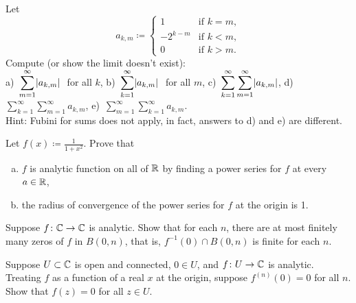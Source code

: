 \begin{exercise}
Let
\begin{equation*}
a_{k,m} \coloneqq
\begin{cases}
1        & \text{if } k=m,\\
-2^{k-m} & \text{if } k<m,\\
0        & \text{if } k>m.
\end{cases}
\end{equation*}
Compute (or show the limit doesn't exist):
\\
a)~$\displaystyle \sum_{m=1}^\infty \lvert {a_{k,m}} \rvert~$ for all $k$,
\hspace{\fill}
b)~$\displaystyle \sum_{k=1}^\infty \lvert {a_{k,m}} \rvert~$ for all $m$,
\hspace{\fill}
c)~$\displaystyle \sum_{k=1}^\infty \sum_{m=1}^\infty \lvert {a_{k,m}} \rvert$,
\hspace{\fill}
d)~$\displaystyle \sum_{k=1}^\infty \sum_{m=1}^\infty a_{k,m}$,
\hspace{\fill}
e)~$\displaystyle \sum_{m=1}^\infty \sum_{k=1}^\infty a_{k,m}$.
\\
Hint: Fubini for sums does not apply, in fact, answers to
d) and e) are different.
\end{exercise}

\begin{exercise}
\pagebreak[2]
Let $f(x) \coloneqq \frac{1}{1+x^2}$.  Prove that
\begin{enumerate}[a)]
\item
$f$ is analytic function on all of ${\mathbb{R}}$
by finding a power series for $f$ at every $a \in {\mathbb{R}}$,
\item
the radius of convergence of
the power series for $f$ at the origin is 1.
\end{enumerate}
\end{exercise}


\begin{exercise}
\pagebreak[2]
Suppose $f \colon {\mathbb{C}} \to {\mathbb{C}}$ is analytic.  Show that for each
$n$, there are at most finitely many zeros of $f$ in $B(0,n)$, that is,
$f^{-1}(0) \cap B(0,n)$ is finite for each $n$.
\end{exercise}

\begin{exercise}
Suppose $U \subset {\mathbb{C}}$ is open and connected, $0 \in U$, and $f \colon U
\to {\mathbb{C}}$ is analytic.  Treating $f$ as a function of a real $x$
at the origin, suppose $f^{(n)}(0) = 0$ for all $n$.  Show that $f(z) = 0$
for all $z \in U$.
\end{exercise}

